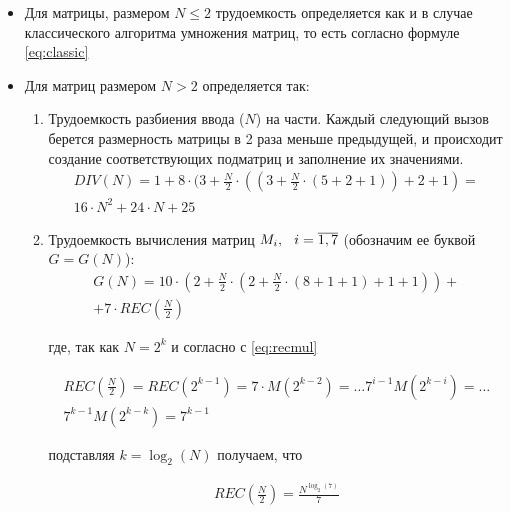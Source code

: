 \begin{itemize}[label=---]
	\item Для матрицы, размером $N \leq 2$ трудоемкость определяется как и в случае классического алгоритма умножения матриц, то есть согласно формуле \ref{eq:classic}
	\item Для матриц размером $N > 2$ определяется так:
	\begin{enumerate}[label={\arabic*)}]
		\item Трудоемкость разбиения ввода ($N$) на части. Каждый следующий вызов берется размерность матрицы в 2 раза меньше предыдущей, и происходит создание
		соответствующих подматриц и заполнение их значениями.
		\begin{equation}
			\label{eq:div}
			\begin{gathered}
			DIV(N) = 1 + 8 \cdot (3 + \frac{N}{2} \cdot ((3 + \frac{N}{2} \cdot (5 + 2 + 1)) + 2 + 1) = \\ 16 \cdot N^2 + 24 \cdot N + 25
			\end{gathered}
		\end{equation}
		\item Трудоемкость вычисления матриц $M_i, \hspace{0.25cm} i = \overline{1, 7}$ (обозначим ее буквой $G = G(N)$):
		\begin{equation}
			\label{eq:G}
			\begin{gathered}
				G(N) = 10 \cdot (2 + \frac{N}{2} \cdot (2 + \frac{N}{2} \cdot (8 + 1 + 1) + 1 + 1)) + \\
				+ 7 \cdot REC(\frac{N}{2})
			\end{gathered}
		\end{equation}
	
		где, так как $N = 2^k$ и согласно с \ref{eq:recmul}
		
		\begin{equation}
			\begin{gathered}
			REC(\frac{N}{2}) = REC(2^{k-1}) = 7 \cdot M(2^{k-2}) = \ldots 7^{i-1} M(2^{k-i}) = \ldots \\
			7^{k-1} M(2^{k-k}) = 7^{k-1}
			\end{gathered}
		\end{equation}
		
		подставляя $k = \log_2(N)$ получаем, что 
		
		\begin{equation}
			\begin{gathered}
				REC(\frac{N}{2}) = \frac{N^{\log_2(7)}}{7}
			\end{gathered}
		\end{equation}
		

\end{enumerate}
\end{itemize}
